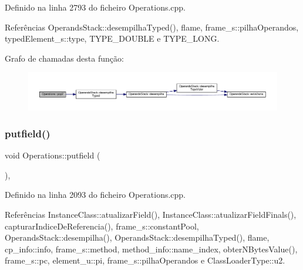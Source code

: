 Definido na linha 2793 do ficheiro Operations.\+cpp.



Referências Operands\+Stack\+::desempilha\+Typed(), flame, frame\+\_\+s\+::pilha\+Operandos, typed\+Element\+\_\+s\+::type, T\+Y\+P\+E\+\_\+\+D\+O\+U\+B\+LE e T\+Y\+P\+E\+\_\+\+L\+O\+NG.

Grafo de chamadas desta função\+:
\nopagebreak
\begin{figure}[H]
\begin{center}
\leavevmode
\includegraphics[width=350pt]{classOperations_a54e578f7f27df39f8c516ec93195e219_cgraph}
\end{center}
\end{figure}
\mbox{\label{classOperations_a56385f246d3d4d5c5674c988a1f0e658}} 
\subsubsection{\texorpdfstring{putfield()}{putfield()}}
{\footnotesize\ttfamily void Operations\+::putfield (\begin{DoxyParamCaption}{ }\end{DoxyParamCaption})\hspace{0.3cm}{\ttfamily [static]}, {\ttfamily [private]}}



Definido na linha 2093 do ficheiro Operations.\+cpp.



Referências Instance\+Class\+::atualizar\+Field(), Instance\+Class\+::atualizar\+Field\+Finals(), capturar\+Indice\+De\+Referencia(), frame\+\_\+s\+::constant\+Pool, Operands\+Stack\+::desempilha(), Operands\+Stack\+::desempilha\+Typed(), flame, cp\+\_\+info\+::info, frame\+\_\+s\+::method, method\+\_\+info\+::name\+\_\+index, obter\+N\+Bytes\+Value(), frame\+\_\+s\+::pc, element\+\_\+u\+::pi, frame\+\_\+s\+::pilha\+Operandos e Class\+Loader\+Type\+::u2.

